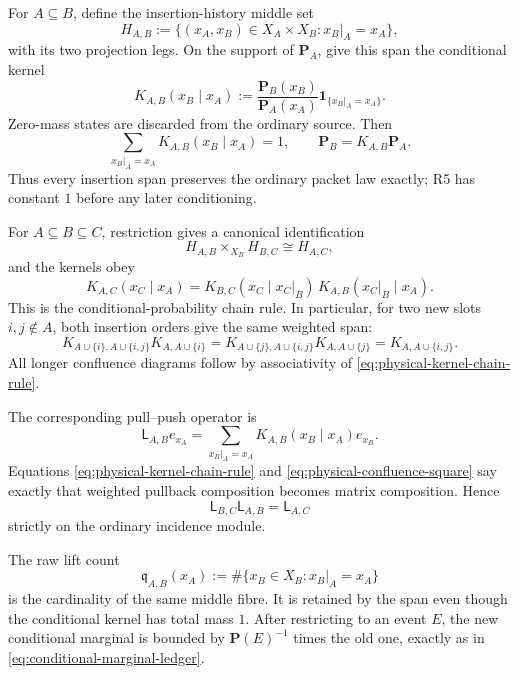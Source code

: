 \documentclass[11pt]{article}
\begin{document}
For \(A\subseteq B\), define the insertion-history middle set
\begin{equation}\label{eq:physical-insertion-middle}
 H_{A,B}
 :=\{(x_A,x_B)\in X_A\times X_B:
          x_B|_A=x_A\},
\end{equation}
with its two projection legs.  On the support of \(\mathbf P_A\), give this
span the conditional kernel
\begin{equation}\label{eq:physical-insertion-kernel}
 K_{A,B}(x_B\mid x_A)
 :=\frac{\mathbf P_B(x_B)}{\mathbf P_A(x_A)}
    \mathbf 1_{\{x_B|_A=x_A\}}.
\end{equation}
Zero-mass states are discarded from the ordinary source.  Then
\[
 \sum_{x_B|_A=x_A}K_{A,B}(x_B\mid x_A)=1,
 \qquad
 \mathbf P_B=K_{A,B}\mathbf P_A.
\]
Thus every insertion span preserves the ordinary packet law exactly; R5 has
constant \(1\) before any later conditioning.

For \(A\subseteq B\subseteq C\), restriction gives a canonical identification
\[
 H_{A,B}\times_{X_B}H_{B,C}\cong H_{A,C},
\]
and the kernels obey
\begin{equation}\label{eq:physical-kernel-chain-rule}
 K_{A,C}(x_C\mid x_A)
 =
 K_{B,C}(x_C\mid x_C|_B)\,
 K_{A,B}(x_C|_B\mid x_A).
\end{equation}
This is the conditional-probability chain rule.  In particular, for two new
slots \(i,j\notin A\), both insertion orders give the same weighted span:
\begin{equation}\label{eq:physical-confluence-square}
 K_{A\cup\{i\},A\cup\{i,j\}}K_{A,A\cup\{i\}}
 =
 K_{A\cup\{j\},A\cup\{i,j\}}K_{A,A\cup\{j\}}
 =
 K_{A,A\cup\{i,j\}}.
\end{equation}
All longer confluence diagrams follow by associativity of
\eqref{eq:physical-kernel-chain-rule}.

The corresponding pull--push operator is
\begin{equation}\label{eq:weighted-span-linearization}
 \mathsf L_{A,B}e_{x_A}
 =
 \sum_{x_B|_A=x_A}
 K_{A,B}(x_B\mid x_A)e_{x_B}.
\end{equation}
Equations \eqref{eq:physical-kernel-chain-rule} and
\eqref{eq:physical-confluence-square} say exactly that weighted pullback
composition becomes matrix composition.  Hence
\[
 \mathsf L_{B,C}\mathsf L_{A,B}=\mathsf L_{A,C}
\]
strictly on the ordinary incidence module.

The raw lift count
\[
 \mathfrak q_{A,B}(x_A)
 :=\#\{x_B\in X_B:x_B|_A=x_A\}
\]
is the cardinality of the same middle fibre.  It is retained by the span even
though the conditional kernel has total mass \(1\).  After restricting to an
event \(E\), the new conditional marginal is bounded by
\(\mathbf P(E)^{-1}\) times the old one, exactly as in
\eqref{eq:conditional-marginal-ledger}.
\end{document}
